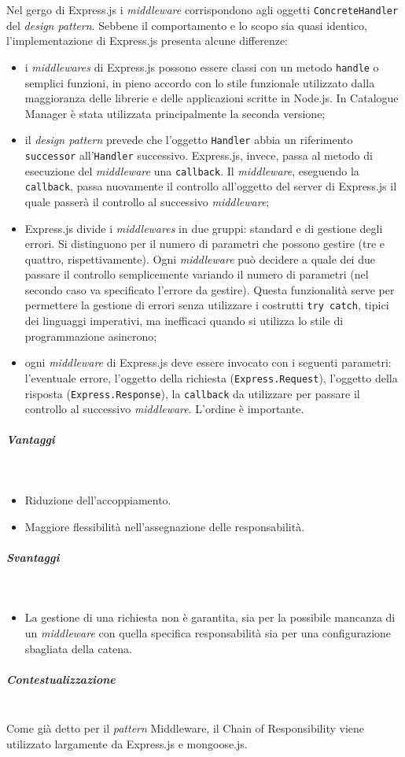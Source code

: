 Nel gergo di Express.js i \textit{middleware} corrispondono agli oggetti \texttt{ConcreteHandler} del \textit{design pattern}. Sebbene il comportamento e lo scopo sia quasi identico, l'implementazione di Express.js presenta alcune differenze:
\begin{itemize}
\item i \textit{middlewares} di Express.js possono essere classi con un metodo \texttt{handle} o semplici funzioni, in pieno accordo con lo stile funzionale utilizzato dalla maggioranza delle librerie e delle applicazioni scritte in Node.js. In Catalogue Manager è stata utilizzata principalmente la seconda versione;
\item il \textit{design pattern} prevede che l'oggetto \texttt{Handler} abbia un riferimento \texttt{successor} all’\texttt{Handler} successivo. Express.js, invece, passa al metodo di esecuzione del \textit{middleware} una \texttt{callback}. Il \textit{middleware}, eseguendo la \texttt{callback}, passa nuovamente il controllo all'oggetto del server di Express.js il quale passerà il controllo al successivo \textit{middleware};
\item Express.js divide i \textit{middlewares} in due gruppi:  standard e di gestione degli errori. Si distinguono per il numero di parametri che possono gestire (tre e quattro, rispettivamente). Ogni \textit{middleware} può decidere a quale dei due passare il controllo semplicemente variando il numero di parametri (nel secondo caso va specificato l'errore da gestire). Questa funzionalità serve per permettere la gestione di errori senza utilizzare i costrutti \texttt{try catch}, tipici dei linguaggi imperativi, ma inefficaci quando si utilizza lo stile di programmazione asincrono;
\item ogni \textit{middleware} di Express.js deve essere invocato con i seguenti parametri: l'eventuale errore, l'oggetto della richiesta (\texttt{Express.Request}), l'oggetto della risposta (\texttt{Express.Response}), la \texttt{callback} da utilizzare per passare il controllo al successivo \textit{middleware}. L'ordine è importante.
\end{itemize}

\subparagraph{Vantaggi} \mbox{} \\
\begin{itemize}
\item Riduzione dell'accoppiamento.
\item Maggiore flessibilità nell'assegnazione delle responsabilità.
\end{itemize}

\subparagraph{Svantaggi} \mbox{} \\
\begin{itemize}
\item La gestione di una richiesta non è garantita, sia per la possibile mancanza di un \textit{middleware} con quella specifica responsabilità sia per una configurazione sbagliata della catena.
\end{itemize}

\subparagraph{Contestualizzazione}\mbox{} \\
Come già detto per il \textit{pattern} Middleware, il Chain of Responsibility viene utilizzato largamente da Express.js e mongoose.js.